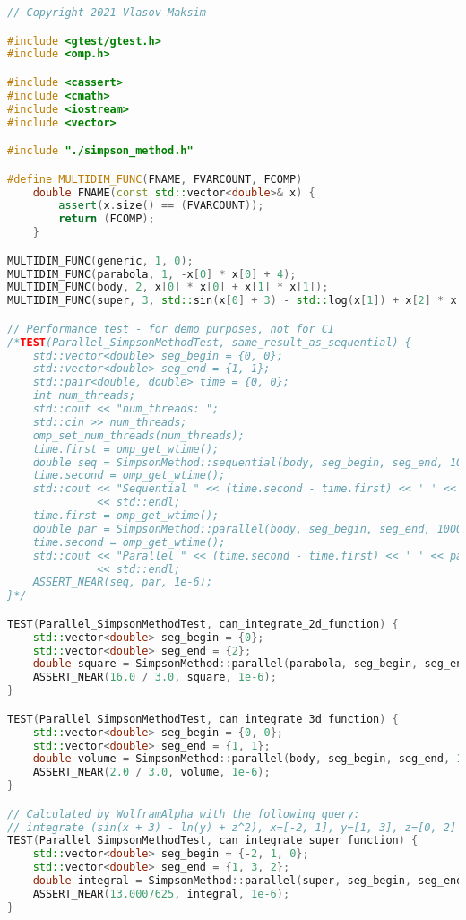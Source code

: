 \documentclass{report}
\begin{document}
\begin{lstlisting}[language=C++]
// Copyright 2021 Vlasov Maksim

#include <gtest/gtest.h>
#include <omp.h>

#include <cassert>
#include <cmath>
#include <iostream>
#include <vector>

#include "./simpson_method.h"

#define MULTIDIM_FUNC(FNAME, FVARCOUNT, FCOMP)                                 \
    double FNAME(const std::vector<double>& x) {                               \
        assert(x.size() == (FVARCOUNT));                                       \
        return (FCOMP);                                                        \
    }

MULTIDIM_FUNC(generic, 1, 0);
MULTIDIM_FUNC(parabola, 1, -x[0] * x[0] + 4);
MULTIDIM_FUNC(body, 2, x[0] * x[0] + x[1] * x[1]);
MULTIDIM_FUNC(super, 3, std::sin(x[0] + 3) - std::log(x[1]) + x[2] * x[2]);

// Performance test - for demo purposes, not for CI
/*TEST(Parallel_SimpsonMethodTest, same_result_as_sequential) {
    std::vector<double> seg_begin = {0, 0};
    std::vector<double> seg_end = {1, 1};
    std::pair<double, double> time = {0, 0};
    int num_threads;
    std::cout << "num_threads: ";
    std::cin >> num_threads;
    omp_set_num_threads(num_threads);
    time.first = omp_get_wtime();
    double seq = SimpsonMethod::sequential(body, seg_begin, seg_end, 10000000);
    time.second = omp_get_wtime();
    std::cout << "Sequential " << (time.second - time.first) << ' ' << seq
              << std::endl;
    time.first = omp_get_wtime();
    double par = SimpsonMethod::parallel(body, seg_begin, seg_end, 10000000);
    time.second = omp_get_wtime();
    std::cout << "Parallel " << (time.second - time.first) << ' ' << par
              << std::endl;
    ASSERT_NEAR(seq, par, 1e-6);
}*/

TEST(Parallel_SimpsonMethodTest, can_integrate_2d_function) {
    std::vector<double> seg_begin = {0};
    std::vector<double> seg_end = {2};
    double square = SimpsonMethod::parallel(parabola, seg_begin, seg_end, 100);
    ASSERT_NEAR(16.0 / 3.0, square, 1e-6);
}

TEST(Parallel_SimpsonMethodTest, can_integrate_3d_function) {
    std::vector<double> seg_begin = {0, 0};
    std::vector<double> seg_end = {1, 1};
    double volume = SimpsonMethod::parallel(body, seg_begin, seg_end, 100);
    ASSERT_NEAR(2.0 / 3.0, volume, 1e-6);
}

// Calculated by WolframAlpha with the following query:
// integrate (sin(x + 3) - ln(y) + z^2), x=[-2, 1], y=[1, 3], z=[0, 2]
TEST(Parallel_SimpsonMethodTest, can_integrate_super_function) {
    std::vector<double> seg_begin = {-2, 1, 0};
    std::vector<double> seg_end = {1, 3, 2};
    double integral = SimpsonMethod::parallel(super, seg_begin, seg_end, 100);
    ASSERT_NEAR(13.0007625, integral, 1e-6);
}


\end{lstlisting}
\end{document}
